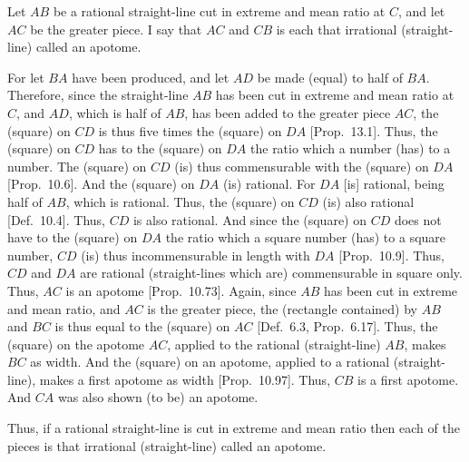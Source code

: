 \begin{Parallel}{}{}
{\epsfysize=0.3in
\centerline{}

Let  $AB$ be a rational straight-line cut in extreme and mean ratio
at $C$, and let $AC$ be the greater piece. I say that  $AC$ and
$CB$ is each that irrational (straight-line) called an apotome.

For let $BA$ have been produced, and let $AD$ be made (equal) to
half of $BA$. Therefore, since the straight-line $AB$ has been cut in
extreme and mean ratio at $C$, and $AD$, which is half of $AB$, has been added to the greater piece $AC$, the (square) on $CD$ is thus 
five times the (square) on $DA$ [Prop.~13.1]. Thus, the (square) on $CD$
has to the (square) on $DA$ the ratio which a number (has) to a number.
The (square) on $CD$ (is) thus commensurable with the (square) on
$DA$ [Prop.~10.6]. And the (square) on $DA$ (is) rational.
For $DA$ [is] rational, being half of $AB$, which is rational.
Thus, the (square) on $CD$ (is) also rational [Def.~10.4]. 
Thus, $CD$ is also rational. And since the (square) on $CD$ does not have to
the (square) on $DA$ the ratio which a square number (has) to a square
number, $CD$ (is) thus incommensurable in length with $DA$ [Prop.~10.9].
Thus, $CD$  and $DA$ are rational (straight-lines which are) commensurable in square only. Thus, $AC$ is an apotome [Prop.~10.73].  Again, since
$AB$ has been cut in extreme and mean ratio, and $AC$ is the greater
piece, the (rectangle contained) by $AB$ and $BC$ is thus equal
to the (square) on $AC$ [Def.~6.3, Prop.~6.17]. Thus, the (square) on
the apotome $AC$, applied to the rational (straight-line) $AB$, makes $BC$
as width. And the (square) on an apotome, applied to a rational
(straight-line), makes a first apotome as width [Prop.~10.97].
Thus, $CB$ is a first apotome. And $CA$ was also
shown (to be) an apotome.

Thus, if a rational straight-line is cut in extreme and mean ratio then each of
the pieces is that irrational (straight-line) called an apotome.}
\end{Parallel}

